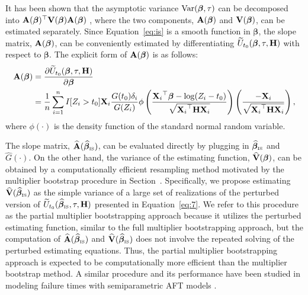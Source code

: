 It has been shown that the asymptotic variance
$\mathop{\rm Var}\nolimits(\bm{\beta}, \tau)$ can be decomposed into
$\mathbf{A}(\bm{\beta})^{\top} \mathbf{V}(\bm{\beta}) \mathbf{A}(\bm{\beta})$ \citep{kim2023smoothed}, 
where the two components, $\mathbf{A}(\bm{\beta})$ and $\mathbf{V}(\bm{\beta})$, can be estimated separately.
Since Equation~\eqref{eq:is} is a smooth function in $\bm{\beta}$, the slope matrix, 
$\mathbf{A}(\bm{\beta})$, can be conveniently estimated by differentiating 
$\widetilde{U}_{t_0}(\bm{\beta}, \tau, \mathbf{H})$ with respect to $\bm{\beta}$. 
The explicit form of $\mathbf{A}(\bm{\beta})$ is as follows:
\begin{align} \label{eq:cov:slp}
  \mathbf{A}(\bm{\beta}) & = \frac{\partial \widetilde{U}_{t_0}(\bm{\beta}, \tau, \mathbf{H})}{\partial \bm{\beta}} \nonumber \\
                       & = \frac{1}{n}\sum_{i=1}^{n} I[Z_i > t_0] \mathbf{X}_i \frac{G(t_0) \delta_i}{G(Z_i)} \phi\left(\frac{{\mathbf{X}_i}^{\top}\bm{\beta} - \log(Z_i-t_0)}{\sqrt{{\mathbf{X}_i}^{\top}\mathbf{H} \mathbf{X}_i}}\right)\left(\frac{-{\mathbf{X}_i}}{\sqrt{{\mathbf{X}_i}^{\top} \mathbf{H} {\mathbf{X}_i}}}\right),
\end{align}
where $\phi (\cdot)$ is the density function of the standard normal random variable.

The slope matrix, $\widehat{\mathbf{A}}(\widehat{\bm{\beta}}_{\tiny\mbox{IS}})$, can be evaluated directly 
by plugging in $\widehat{\bm{\beta}}_{\tiny\mbox{IS}}$ and $\widehat{G}(\cdot)$. 
On the other hand, the variance of the estimating function, 
$\widehat{\mathbf{V}}(\bm{\beta})$, can be obtained by a computationally efficient 
resampling method motivated by the multiplier bootstrap procedure in 
Section~.
Specifically, we propose estimating $\widehat{\mathbf{V}}(\widehat{\bm{\beta}}_{\tiny\mbox{IS}})$ as the 
simple variance of a large set of realizations of the perturbed version of 
$\widetilde{U}_{t_0}(\widehat{\bm{\beta}}_{\tiny\mbox{IS}}, \tau, \mathbf{H})$ presented in Equation~\eqref{eq:7}.
We refer to this procedure as the partial multiplier bootstrapping approach 
because it utilizes the perturbed estimating function, 
similar to the full multiplier bootstrapping approach, 
but the computation of $\widehat{\mathbf{A}}(\widehat{\bm{\beta}}_{\tiny\mbox{IS}})$ and $\widehat{\mathbf{V}}(\widehat{\bm{\beta}}_{\tiny\mbox{IS}})$ 
does not involve the repeated solving of the perturbed estimating equations.
Thus, the partial multiplier bootstrapping approach is expected to be computationally 
more efficient than the multiplier bootstrap method. 
A similar procedure and its performance have been studied in modeling failure 
times with semiparametric AFT models \citep{chiou2014fast,aftgeepackage}.

